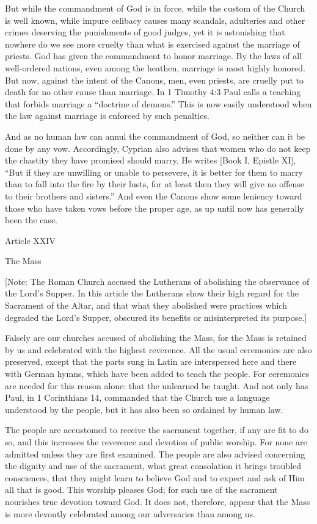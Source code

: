 But while the commandment of God is in force, while the custom of the Church is well known, while impure celibacy causes many scandals, adulteries and other crimes deserving the punishments of good judges, yet it is astonishing that nowhere do we see more cruelty than what is exercised against the marriage of priests. God has given the commandment to honor marriage. By the laws of all well-ordered nations, even among the heathen, marriage is most highly honored. But now, against the intent of the Canons, men, even priests, are cruelly put to death for no other cause than marriage. In 1 Timothy 4:3 Paul calls a teaching that forbids marriage a “doctrine of demons.” This is now easily understood when the law against marriage is enforced by such penalties.

And as no human law can annul the commandment of God, so neither can it be done by any vow. Accordingly, Cyprian also advises that women who do not keep the chastity they have promised should marry. He writes [Book I, Epistle XI], “But if they are unwilling or unable to persevere, it is better for them to marry than to fall into the fire by their lusts, for at least then they will give no offense to their brothers and sisters.” And even the Canons show some leniency toward those who have taken vows before the proper age, as up until now has generally been the case.

 

Article XXIV

The Mass

[Note: The Roman Church accused the Lutherans of abolishing the observance of the Lord’s Supper. In this article the Lutherans show their high regard for the Sacrament of the Altar, and that what they abolished were practices which degraded the Lord’s Supper, obscured its benefits or misinterpreted its purpose.]

Falsely are our churches accused of abolishing the Mass, for the Mass is retained by us and celebrated with the highest reverence. All the usual ceremonies are also preserved, except that the parts sung in Latin are interspersed here and there with German hymns, which have been added to teach the people. For ceremonies are needed for this reason alone: that the unlearned be taught. And not only has Paul, in 1 Corinthians 14, commanded that the Church use a language understood by the people, but it has also been so ordained by human law.

The people are accustomed to receive the sacrament together, if any are fit to do so, and this increases the reverence and devotion of public worship. For none are admitted unless they are first examined. The people are also advised concerning the dignity and use of the sacrament, what great consolation it brings troubled consciences, that they might learn to believe God and to expect and ask of Him all that is good. This worship pleases God; for such use of the sacrament nourishes true devotion toward God. It does not, therefore, appear that the Mass is more devoutly celebrated among our adversaries than among us.

